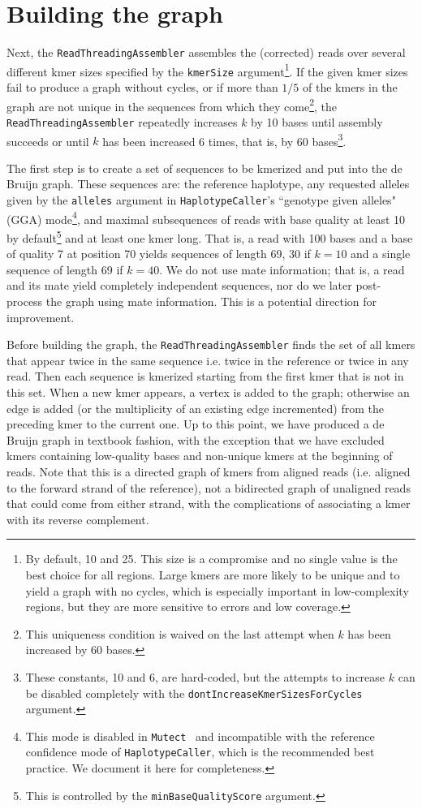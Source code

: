 \documentclass[nofootinbib,amssymb,amsmath]{revtex4}
\newcommand{\HC}{\texttt{HaplotypeCaller}}
\newcommand{\Mutect}{\texttt{Mutect}}
\newcommand{\code}[1]{\texttt{#1}}
\begin{document}
\section{Building the graph} \label{graph-assembly}
Next, the \code{ReadThreadingAssembler} assembles the (corrected) reads over several different kmer sizes specified by the \code{kmerSize} argument\footnote{By default, 10 and 25.  This size is a compromise and no single value is the best choice for all regions.  Large kmers are more likely to be unique and to yield a graph with no cycles, which is especially important in low-complexity regions, but they are more sensitive to errors and low coverage.}.  If the given kmer sizes fail to produce a graph without cycles, or if more than $1/5$ of the kmers in the graph are not unique in the sequences from which they come\footnote{This uniqueness condition is waived on the last attempt when $k$ has been increased by 60 bases.}, the \code{ReadThreadingAssembler} repeatedly increases $k$ by 10 bases until assembly succeeds or until $k$ has been increased 6 times, that is, by 60 bases\footnote{These constants, 10 and 6, are hard-coded, but the attempts to increase $k$ can be disabled completely with the \code{dontIncreaseKmerSizesForCycles} argument.}.

The first step is to create a set of sequences to be kmerized and put into the de Bruijn graph.  These sequences are: the reference haplotype, any requested alleles given by the \code{alleles} argument in \HC's ``genotype given alleles" (GGA) mode\footnote{This mode is disabled in \Mutect~ and incompatible with the reference confidence mode of \HC, which is the recommended best practice.  We document it here for completeness.}, and maximal subsequences of reads with base quality at least 10 by default\footnote{This is controlled by the \code{minBaseQualityScore} argument.} and at least one kmer long.  That is, a read with 100 bases and a base of quality 7 at position 70 yields sequences of length 69, 30 if $k = 10$ and a single sequence of length 69 if $k = 40$.  We do not use mate information; that is, a read and its mate yield completely independent sequences, nor do we later post-process the graph using mate information.  This is a potential direction for improvement.

Before building the graph, the \code{ReadThreadingAssembler} finds the set of all kmers that appear twice in the same sequence i.e. twice in the reference or twice in any read.  Then each sequence is kmerized starting from the first kmer that is not in this set.  When a new kmer appears, a vertex is added to the graph; otherwise an edge is added (or the multiplicity of an existing edge incremented) from the preceding kmer to the current one.  Up to this point, we have produced a de Bruijn graph in textbook fashion, with the exception that we have excluded kmers containing low-quality bases and non-unique kmers at the beginning of reads.  Note that this is a directed graph of kmers from aligned reads (i.e. aligned to the forward strand of the reference), not a bidirected graph of unaligned reads that could come from either strand, with the complications of associating a kmer with its reverse complement.
\end{document}
